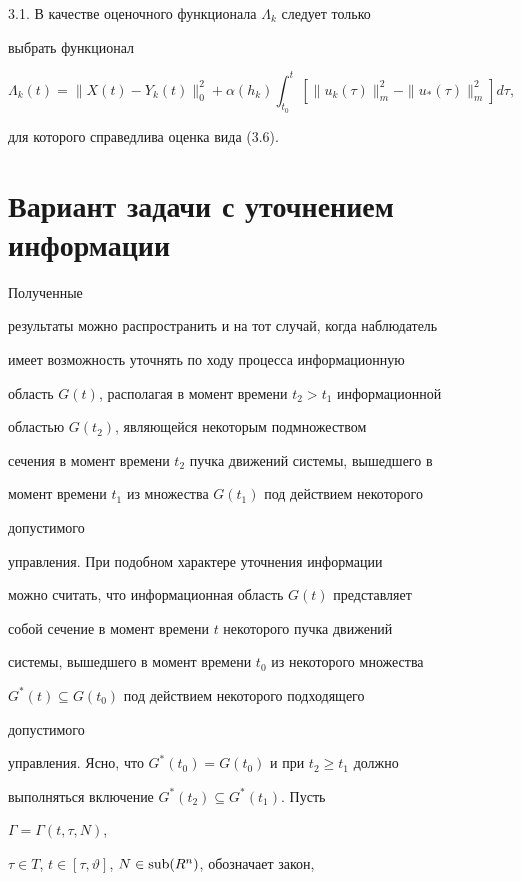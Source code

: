 3.1. В качестве оценочного функционала $\Lambda_k$ следует только 


выбрать функционал 


$$ 


\Lambda_k(t)=\|X(t)-Y_k(t)\|^2_0+\alpha(h_k) 


\int^t_{t_0}[\|u_k(\tau)\|^2_m-\|u_*(\tau)\|^2_m]d\tau, 


$$ 


для которого справедлива оценка вида (3.6). 


 


\section{Вариант задачи с уточнением информации} 


 


Полученные 


результаты можно распространить и на тот случай, когда наблюдатель 


имеет возможность уточнять по ходу процесса информационную 


область $G(t)$, располагая в момент времени $t_2>t_1$ информационной 


областью $G(t_2)$, являющейся некоторым подмножеством 


сечения в момент времени $t_2$ пучка движений системы, вышедшего в 


момент времени $t_1$ из множества $G(t_1)$ под действием некоторого 


допустимого 


управления. При подобном характере уточнения информации 


можно считать, что информационная область $G(t)$ представляет 


собой сечение в момент времени $t$ некоторого пучка движений 


системы, вышедшего в момент времени $t_0$ из некоторого множества 


$G^*(t)\subseteq G(t_0)$ под действием некоторого подходящего 


допустимого 


управления. Ясно, что $G^*(t_0)=G(t_0)$ и при $t_2\ge t_1$ должно 


выполняться включение $G^*(t_2)\subseteq G^*(t_1)$. Пусть 


$\Gamma=\Gamma(t,\tau,N)$, 


$\tau\in T$, $t\in[\tau,\vartheta]$, $N\in\operatorname{sub}(R^n)$, обозначает закон, 


